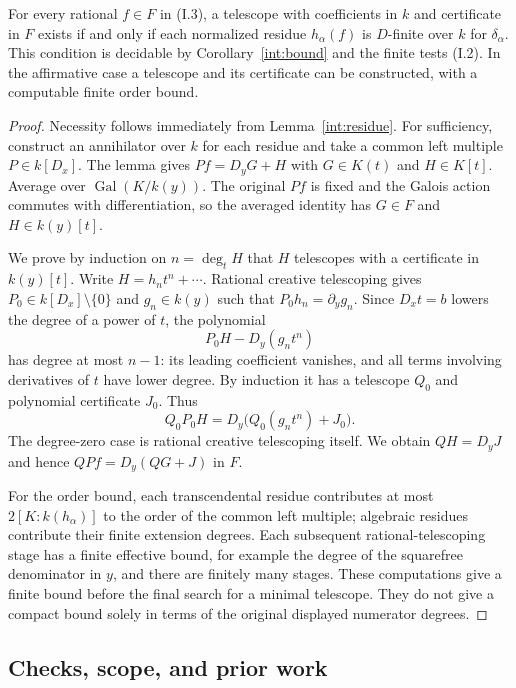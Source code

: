 \begin{theorem}
\label{int:primitive}
For every rational $f\in F$ in (I.3), a telescope with coefficients in
$k$ and certificate in $F$ exists if and only if each normalized residue
$h_\alpha(f)$ is $D$-finite over $k$ for $\delta_\alpha$.
This condition is decidable by Corollary~\ref{int:bound} and the finite
tests (I.2).  In the affirmative case a telescope and its certificate
can be constructed, with a computable finite order bound.
\end{theorem}
\begin{proof}
Necessity follows immediately from Lemma~\ref{int:residue}.
For sufficiency, construct an annihilator over $k$ for each residue and
take a common left multiple $P\in k[D_x]$.
The lemma gives $Pf=D_yG+H$ with $G\in K(t)$ and $H\in K[t]$.
Average over $\operatorname{Gal}(K/k(y))$.  The original $Pf$ is fixed
and the Galois action commutes with differentiation, so the averaged
identity has $G\in F$ and $H\in k(y)[t]$.

We prove by induction on $n=\deg_tH$ that $H$ telescopes with a
certificate in $k(y)[t]$.  Write $H=h_nt^n+\cdots$.
Rational creative telescoping gives $P_0\in k[D_x]\setminus\{0\}$
and $g_n\in k(y)$ such that $P_0h_n=\partial_yg_n$.
Since $D_xt=b$ lowers the degree of a power of $t$, the polynomial
\[
             P_0H-D_y(g_nt^n)
\]
has degree at most $n-1$: its leading coefficient vanishes, and all
terms involving derivatives of $t$ have lower degree.
By induction it has a telescope $Q_0$ and polynomial
certificate $J_0$.  Thus
\[
       Q_0P_0H=D_y\bigl(Q_0(g_nt^n)+J_0\bigr).
\]
The degree-zero case is rational creative telescoping itself.
We obtain $QH=D_yJ$ and hence $QPf=D_y(QG+J)$ in $F$.

For the order bound, each transcendental residue contributes at most
$2[K:k(h_\alpha)]$ to the order of the common left multiple; algebraic
residues contribute their finite extension degrees.  Each subsequent
rational-telescoping stage has a finite effective bound, for example
the degree of the squarefree denominator in $y$, and there are finitely
many stages.  These computations give a finite bound before the final
search for a minimal telescope.  They do not give a compact bound solely
in terms of the original displayed numerator degrees.
\end{proof}

\subsection{Checks, scope, and prior work}


